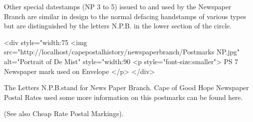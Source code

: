Other special datestamps (NP 3 to 5) issued to and used by the Newspaper Branch are similar in design to the normal defacing handstamps of various types but are distinguished by the letters N.P.B. in the lower section of the
circle.

<div style="width:75%
<img src="http://localhost/capepostalhistory/newspaperbranch/Postmarks NP.jpg" alt="Portrait of De Mist" style="width:90%
<p style="font-size:smaller"> 
PS 7 Newspaper mark used on Envelope
</p>
</div>

The Letters N.P.B.stand for News Paper Branch. Cape of Good Hope Newspaper Postal Rates used some more information on this postmarks can be found here.

(See also Cheap Rate Postal Markings).

 

  

 

             